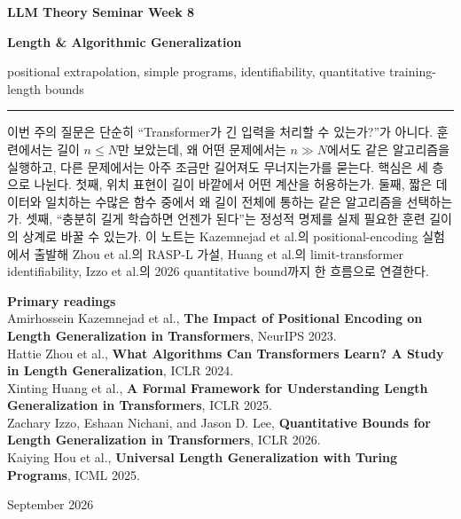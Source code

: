 \documentclass[11pt,a4paper,oneside,openany]{memoir}
\theoremstyle{definition}
\begin{document}
\begin{titlingpage}
\thispagestyle{empty}
\vspace*{1.2cm}
{\small\bfseries LLM Theory Seminar \hfill Week 8\par}
\vspace{1.4cm}
{\huge\bfseries Length \& Algorithmic Generalization\par}
\vspace{0.55cm}
{\large positional extrapolation, simple programs, identifiability, quantitative training-length bounds\par}
\vspace{0.9cm}
\rule{\textwidth}{0.7pt}
\vspace{1.1cm}

\begin{minipage}{0.86\textwidth}
\small
이번 주의 질문은 단순히 ``Transformer가 긴 입력을 처리할 수 있는가?''가 아니다.
훈련에서는 길이 $n\le N$만 보았는데, 왜 어떤 문제에서는 $n\gg N$에서도 같은 알고리즘을 실행하고,
다른 문제에서는 아주 조금만 길어져도 무너지는가를 묻는다.
핵심은 세 층으로 나뉜다.
첫째, 위치 표현이 길이 바깥에서 어떤 계산을 허용하는가.
둘째, 짧은 데이터와 일치하는 수많은 함수 중에서 왜 길이 전체에 통하는 같은 알고리즘을 선택하는가.
셋째, ``충분히 길게 학습하면 언젠가 된다''는 정성적 명제를 실제 필요한 훈련 길이의 상계로 바꿀 수 있는가.
이 노트는 Kazemnejad et al.의 positional-encoding 실험에서 출발해 Zhou et al.의 RASP-L 가설,
Huang et al.의 limit-transformer identifiability, Izzo et al.의 2026 quantitative bound까지 한 흐름으로 연결한다.
\end{minipage}

\vfill
{\small
\textbf{Primary readings}\\[0.25em]
Amirhossein Kazemnejad et al.,
\textbf{The Impact of Positional Encoding on Length Generalization in Transformers}, NeurIPS 2023.\\
Hattie Zhou et al.,
\textbf{What Algorithms Can Transformers Learn? A Study in Length Generalization}, ICLR 2024.\\
Xinting Huang et al.,
\textbf{A Formal Framework for Understanding Length Generalization in Transformers}, ICLR 2025.\\
Zachary Izzo, Eshaan Nichani, and Jason D. Lee,
\textbf{Quantitative Bounds for Length Generalization in Transformers}, ICLR 2026.\\
Kaiying Hou et al.,
\textbf{Universal Length Generalization with Turing Programs}, ICML 2025.
\par}
\vspace{0.8cm}
{\small September 2026\par}
\end{titlingpage}
\end{document}

